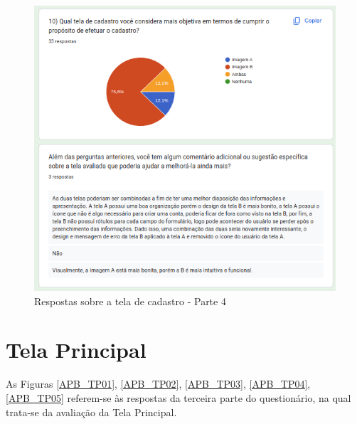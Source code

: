 \begin{figure}[!h]
	\begin{center}
	    \includegraphics[scale=0.7]{figs/Answers/Students/11.png}
	\end{center}
	\caption{\label{APB_TC04}Respostas sobre a tela de cadastro - Parte 4}
\end{figure}

\newpage

\section{Tela Principal}

As Figuras \ref{APB_TP01}, \ref{APB_TP02}, \ref{APB_TP03}, \ref{APB_TP04}, \ref{APB_TP05} referem-se às respostas da terceira parte do questionário, na qual trata-se da avaliação da Tela Principal.

